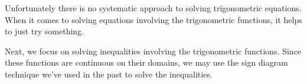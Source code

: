 \medskip
 
Unfortunately there is no systematic approach to solving trigonometric equations. When it comes to solving equations involving the trigonometric functions, it helps to just try something.  

Next, we focus on solving inequalities involving the trigonometric functions.  Since these functions are continuous on their domains, we may use the sign diagram technique we've used in the past to solve the inequalities. 


\medskip

